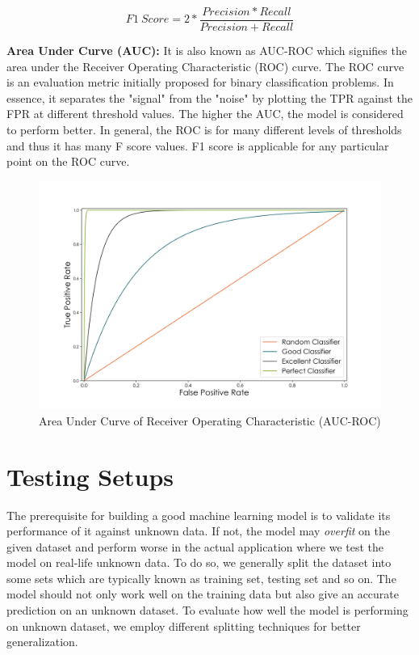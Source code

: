 \[ F1\:Score = 2*\frac{Precision*Recall}{Precision + Recall}\]

\textbf{Area Under Curve (AUC):}
It is also known as AUC-ROC which signifies the area under the Receiver Operating Characteristic (ROC) curve. The ROC curve is an evaluation metric initially proposed for binary classification problems. In essence, it separates the "signal" from the "noise" by plotting the TPR against the FPR at different threshold values. The higher the AUC, the model is considered to perform better. In general, the ROC is for many different levels of thresholds and thus it has many F score values. F1 score is applicable for any particular point on the ROC curve.

\begin{figure}[H]
\centering
\includegraphics[width=1.0\textwidth]{./figure/chap 5/AUC.png}
\caption{Area Under Curve of Receiver Operating Characteristic (AUC-ROC)}
\label{Fig 5.1}
\end{figure}

\section{Testing Setups}
The prerequisite for building a good machine learning model is to validate its performance of it against unknown data. If not, the model may \emph{overfit} on the given dataset and perform worse in the actual application where we test the model on real-life unknown data. To do so, we generally split the dataset into some sets which are typically known as training set, testing set and so on. The model should not only work well on the training data but also give an accurate prediction on an unknown dataset. To evaluate how well the model is performing on unknown dataset, we employ different splitting techniques for better generalization.

